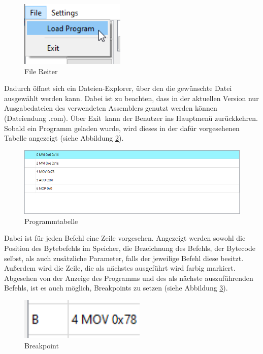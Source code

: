 \documentclass[12pt]{article}
\newcommand{\imgSpaceBefore}{\vspace{10pt}}
\begin{document}
\begin{figure}[H]
\centering
\includegraphics[width=5cm]{bilder/LoadFile}
\caption{File Reiter}
\label{fig:LoadFile}
\end{figure}

\noindent
Dadurch öffnet sich ein Dateien-Explorer, über den die gewünschte Datei ausgewählt werden kann. Dabei ist zu beachten, dass in der aktuellen Version nur Ausgabedateien des verwendeten Assemblers genutzt werden können (Dateiendung \glqq .com\grqq). Über \glqq Exit\grqq\ kann der Benutzer ins Hauptmenü zurückkehren. Sobald ein Programm geladen wurde, wird dieses in der dafür vorgesehenen Tabelle angezeigt (siehe Abbildung \ref{fig:ProgTable}).\imgSpaceBefore

\begin{figure}[H]
\centering
\includegraphics[width=15cm]{bilder/Program_table}
\caption{Programmtabelle}
\label{fig:ProgTable}
\end{figure}

\noindent
Dabei ist für jeden Befehl eine Zeile vorgesehen. Angezeigt werden sowohl die Position des Bytebefehls im Speicher, die Bezeichnung des Befehls, der Bytecode selbst, als auch zusätzliche Parameter, falls der jeweilige Befehl diese besitzt. Außerdem wird die Zeile, die als nächstes ausgeführt wird farbig markiert. Abgesehen von der Anzeige des Programms und des als nächste auszuführenden Befehls, ist es auch möglich, Breakpoints zu setzen (siehe Abbildung \ref{fig:Break}).\imgSpaceBefore

\begin{figure}[h]
\centering
\includegraphics[width=6cm]{bilder/Breakpoint}
\caption{Breakpoint}
\label{fig:Break}
\end{figure}
\end{document}
